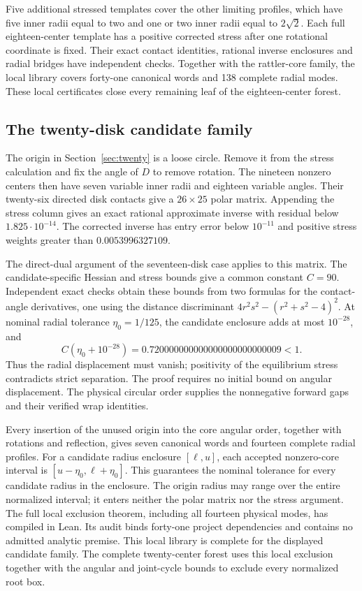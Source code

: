 \documentclass[11pt]{amsart}
\theoremstyle{definition}
\theoremstyle{remark}
\begin{document}
Five additional stressed templates cover the other limiting profiles, which
have five inner radii equal to two and one or two inner radii equal to
$2\sqrt2$. Each full eighteen-center template has a positive corrected
stress after one rotational coordinate is fixed. Their exact contact
identities, rational inverse enclosures and radial bridges have independent
checks. Together with the rattler-core family, the local library covers
forty-one canonical words and 138 complete radial modes. These local
certificates close every remaining leaf of the eighteen-center forest.

\subsection{The twenty-disk candidate family}
The origin in Section~\ref{sec:twenty} is a loose circle. Remove it from
the stress calculation and fix the angle of $D$ to remove rotation.
The nineteen nonzero centers then have seven variable inner radii and
eighteen variable angles. Their twenty-six directed disk contacts give
a $26\times25$ polar matrix. Appending the stress column gives an exact
rational approximate inverse with residual below $1.825\cdot10^{-14}$.
The corrected inverse has entry error below $10^{-11}$ and positive stress
weights greater than $0.0053996327109$.

The direct-dual argument of the seventeen-disk case applies to this matrix.
The candidate-specific Hessian and stress bounds give a common constant
$C=90$. Independent exact checks obtain these bounds from two formulas
for the contact-angle derivatives, one using the distance discriminant
$4r^2s^2-(r^2+s^2-4)^2$. At nominal radial tolerance $\eta_0=1/125$,
the candidate enclosure adds at most $10^{-28}$, and
\[
 C(\eta_0+10^{-28})
 =0.720000000000000000000000009<1.
\]
Thus the radial displacement must vanish; positivity of the equilibrium
stress contradicts strict separation. The proof requires no initial bound
on angular displacement. The physical circular order supplies the
nonnegative forward gaps and their verified wrap identities.

Every insertion of the unused origin into the core angular order, together
with rotations and reflection, gives seven canonical words and fourteen
complete radial profiles. For a candidate radius enclosure $[\ell,u]$,
each accepted nonzero-core interval is $[u-\eta_0,\ell+\eta_0]$.
This guarantees the nominal tolerance for every candidate radius in the
enclosure. The origin radius may range over the entire normalized interval;
it enters neither the polar matrix nor the stress argument.
The full local exclusion theorem, including all fourteen physical modes,
has compiled in Lean. Its audit binds forty-one project dependencies and
contains no admitted analytic premise. This local library is complete for
the displayed candidate family. The complete twenty-center forest uses
this local exclusion together with the angular and joint-cycle bounds to
exclude every normalized root box.
\end{document}
